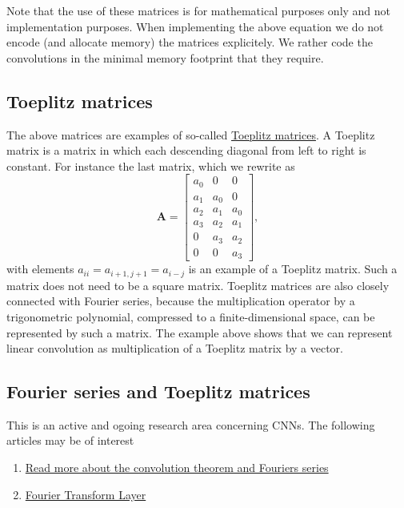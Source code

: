 \documentclass[%
oneside,                 %
final,                   %
10pt]{article}
\begin{document}
Note that the use of these matrices is for mathematical purposes only
and not implementation purposes.  When implementing the above equation
we do not encode (and allocate memory) the matrices explicitely.  We
rather code the convolutions in the minimal memory footprint that they
require.

\subsection{Toeplitz matrices}

The above matrices are examples of so-called \href{{https://link.springer.com/book/10.1007/978-93-86279-04-0}}{Toeplitz
matrices}. A
Toeplitz matrix is a matrix in which each descending diagonal from
left to right is constant. For instance the last matrix, which we
rewrite as
\[
\bm{A}=\begin{bmatrix}a_0 & 0 & 0  \\
                            a_1 & a_0 & 0  \\
			    a_2 & a_1 & a_0  \\
			    a_3 & a_2 & a_1 \\
			    0 & a_3 & a_2 \\
			    0 & 0 & a_3
			    \end{bmatrix},
\]
with elements $a_{ii}=a_{i+1,j+1}=a_{i-j}$ is an example of a Toeplitz
matrix. Such a matrix does not need to be a square matrix.  Toeplitz
matrices are also closely connected with Fourier series, because the multiplication operator by a trigonometric
polynomial, compressed to a finite-dimensional space, can be
represented by such a matrix. The example above shows that we can
represent linear convolution as multiplication of a Toeplitz matrix by
a vector.

\subsection{Fourier series and Toeplitz matrices}

This is an active and ogoing research area concerning CNNs. The following articles may be of interest
\begin{enumerate}
\item \href{{https://www.sciencedirect.com/topics/engineering/convolution-theorem#:~:text=The%20convolution%20theorem%20(together%20with,k%20)%20G%20(%20k%20)%20.}}{Read more about the convolution theorem and Fouriers series}

\item \href{{https://www.sciencedirect.com/science/article/pii/S1568494623006257}}{Fourier Transform Layer}
\end{enumerate}
\end{document}
